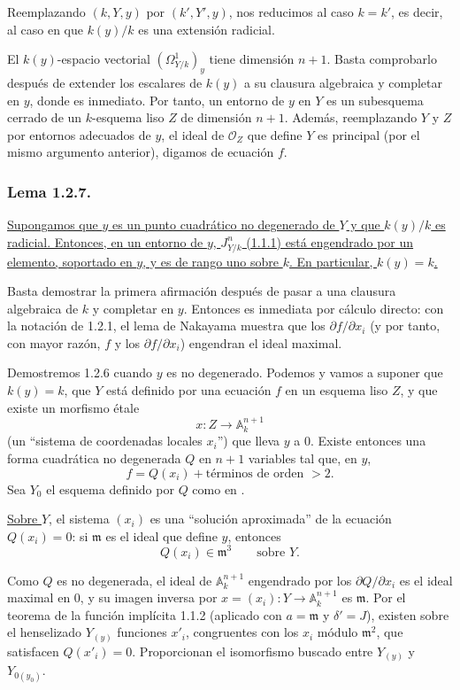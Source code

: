 \pageoriginale

Reemplazando $(k,Y,y)$ por $(k',Y',y)$, nos reducimos al caso
$k=k'$, es decir, al caso en que $k(y)/k$ es una extensión radicial.

El $k(y)$-espacio vectorial $(\Omega^1_{Y/k})_y$ tiene dimensión
$n+1$. Basta comprobarlo después de extender los escalares de $k(y)$
a su clausura algebraica y completar en $y$, donde es inmediato. Por
tanto, un entorno de $y$ en $Y$ es un subesquema cerrado de un
$k$-esquema liso $Z$ de dimensión $n+1$. Además, reemplazando $Y$ y
$Z$ por entornos adecuados de $y$, el ideal de $\mathcal O_Z$ que
define $Y$ es principal (por el mismo argumento anterior), digamos de
ecuación $f$.

\subsubsection*{Lema 1.2.7.}
\underline{Supongamos que $y$ es un punto cuadrático no degenerado de
$Y$ y que $k(y)/k$ es radicial. Entonces, en un entorno de $y$,
$J^n_{Y/k}$ (1.1.1) está engendrado por un elemento, soportado en $y$,
y es de rango uno sobre $k$. En particular, $k(y)=k$.}

Basta demostrar la primera afirmación después de pasar a una clausura
algebraica de $k$ y completar en $y$. Entonces es inmediata por cálculo
directo: con la notación de 1.2.1, el lema de Nakayama muestra que los
$\partial f/\partial x_i$ (y por tanto, con mayor razón, $f$ y los
$\partial f/\partial x_i$) engendran el ideal maximal.

Demostremos 1.2.6 cuando $y$ es no degenerado. Podemos y vamos a
suponer que $k(y)=k$, que $Y$ está definido por una ecuación $f$ en un
esquema liso $Z$, y que existe un morfismo étale
\[
x:Z\longrightarrow\mathbb A_k^{n+1}
\]
(un ``sistema de coordenadas locales $x_i$'') que lleva $y$ a $0$.
Existe entonces una forma cuadrática no degenerada $Q$ en $n+1$
variables tal que, en $y$,
\[
f=Q(x_i)+\text{términos de orden }>2.
\]
Sea $Y_0$ el esquema definido por $Q$ como en
.

\underline{Sobre $Y$}, el sistema $(x_i)$ es una ``solución aproximada''
de la ecuación $Q(x_i)=0$: si $\mathfrak m$ es el ideal que define
$y$, entonces
\[
Q(x_i)\in\mathfrak m^3\qquad\text{sobre }Y.
\]

\pageoriginale

Como $Q$ es no degenerada, el ideal de $\mathbb A_k^{n+1}$ engendrado
por los $\partial Q/\partial x_i$ es el ideal maximal en $0$, y su
imagen inversa por $x=(x_i):Y\to\mathbb A_k^{n+1}$ es $\mathfrak m$.
Por el teorema de la función implícita 1.1.2 (aplicado con
$a=\mathfrak m$ y $\delta'=J$), existen sobre el henselizado $Y_{(y)}$
funciones $x'_i$, congruentes con los $x_i$ módulo $\mathfrak m^2$,
que satisfacen $Q(x'_i)=0$. Proporcionan el isomorfismo buscado entre
$Y_{(y)}$ y $Y_{0(y_0)}$.

